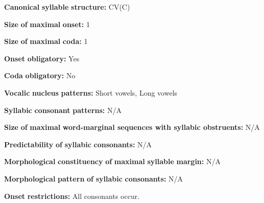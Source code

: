 \documentclass[output=paper]{langsci/langscibook}
\begin{document}
\begin{styleBody}
\textbf{Canonical} \textbf{syllable} \textbf{structure:} CV(C) \citep[27-28]{Givón2011}
\end{styleBody}

\begin{styleBody}
\textbf{Size} \textbf{of} \textbf{maximal} \textbf{onset:} 1
\end{styleBody}

\begin{styleBody}
\textbf{Size} \textbf{of} \textbf{maximal} \textbf{coda:} 1
\end{styleBody}

\begin{styleBody}
\textbf{Onset} \textbf{obligatory:} Yes
\end{styleBody}

\begin{styleBody}
\textbf{Coda} \textbf{obligatory:} No
\end{styleBody}

\begin{styleBody}
\textbf{Vocalic} \textbf{nucleus} \textbf{patterns:} Short vowels, Long vowels
\end{styleBody}

\begin{styleBody}
\textbf{Syllabic} \textbf{consonant} \textbf{patterns:} N/A
\end{styleBody}

\begin{styleBody}
\textbf{Size} \textbf{of} \textbf{maximal} \textbf{word{}-marginal sequences with syllabic obstruents:} N/A
\end{styleBody}

\begin{styleBody}
\textbf{Predictability} \textbf{of} \textbf{syllabic} \textbf{consonants:} N/A
\end{styleBody}

\begin{styleBody}
\textbf{Morphological} \textbf{constituency} \textbf{of} \textbf{maximal} \textbf{syllable} \textbf{margin:} N/A
\end{styleBody}

\begin{styleBody}
\textbf{Morphological} \textbf{pattern} \textbf{of} \textbf{syllabic} \textbf{consonants:} N/A
\end{styleBody}

\begin{styleBody}
\textbf{Onset} \textbf{restrictions:} All consonants occur.
\end{styleBody}
\end{document}
